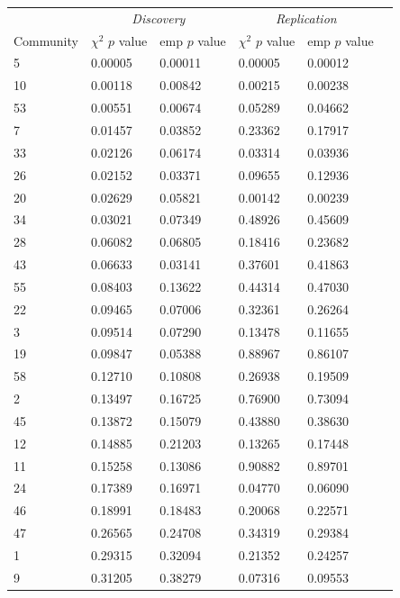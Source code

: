 \begin{table}[ht]
\centering
\setlength{\extrarowheight}{2pt}
\begin{tabular}{llllll}
  \toprule
   &  \multicolumn{2}{c}{\textit{Discovery}} & \multicolumn{2}{c}{\textit{Replication}} \\
   \cmidrule{2-5}
 Community & $\chi^2$ $p$ value  & emp $p$ value  & $\chi^2$ $p$ value   & emp $p$ value   \\ 
  \midrule
5 & 0.00005 & 0.00011 & 0.00005 & 0.00012 \\ 
  10 & 0.00118 & 0.00842 & 0.00215 & 0.00238 \\ 
  53 & 0.00551 & 0.00674 & 0.05289 & 0.04662 \\ 
  7 & 0.01457 & 0.03852 & 0.23362 & 0.17917 \\ 
  33 & 0.02126 & 0.06174 & 0.03314 & 0.03936 \\ 
  26 & 0.02152 & 0.03371 & 0.09655 & 0.12936 \\ 
  20 & 0.02629 & 0.05821 & 0.00142 & 0.00239 \\ 
  34 & 0.03021 & 0.07349 & 0.48926 & 0.45609 \\ 
  28 & 0.06082 & 0.06805 & 0.18416 & 0.23682 \\ 
  43 & 0.06633 & 0.03141 & 0.37601 & 0.41863 \\ 
  55 & 0.08403 & 0.13622 & 0.44314 & 0.47030 \\ 
  22 & 0.09465 & 0.07006 & 0.32361 & 0.26264 \\ 
  3 & 0.09514 & 0.07290 & 0.13478 & 0.11655 \\ 
  19 & 0.09847 & 0.05388 & 0.88967 & 0.86107 \\ 
  58 & 0.12710 & 0.10808 & 0.26938 & 0.19509 \\ 
  2 & 0.13497 & 0.16725 & 0.76900 & 0.73094 \\ 
  45 & 0.13872 & 0.15079 & 0.43880 & 0.38630 \\ 
  12 & 0.14885 & 0.21203 & 0.13265 & 0.17448 \\ 
  11 & 0.15258 & 0.13086 & 0.90882 & 0.89701 \\ 
  24 & 0.17389 & 0.16971 & 0.04770 & 0.06090 \\ 
  46 & 0.18991 & 0.18483 & 0.20068 & 0.22571 \\ 
  47 & 0.26565 & 0.24708 & 0.34319 & 0.29384 \\ 
  1 & 0.29315 & 0.32094 & 0.21352 & 0.24257 \\ 
  9 & 0.31205 & 0.38279 & 0.07316 & 0.09553 \\ 

\end{tabular}
\end{table}
